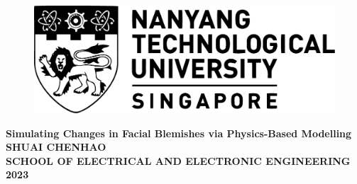 \begin{titlepage}

\begin{figure}[h!]
\centering
\includegraphics[width=1\textwidth]{Title/NTU-LOGO-bw.pdf}
\caption*{}
\label{fig:entropy} 
\end{figure}

\vspace{1.5in}

\centering
\Huge{\textbf{Simulating Changes in Facial Blemishes via Physics-Based Modelling}}\\[2.5in]

\LARGE{\textbf{SHUAI CHENHAO}}\\[0.5in]

\normalsize{\textbf{SCHOOL OF ELECTRICAL AND ELECTRONIC ENGINEERING}}\\[0.2in]


\large{\textbf{2023}}
\end{titlepage}
\newpage
